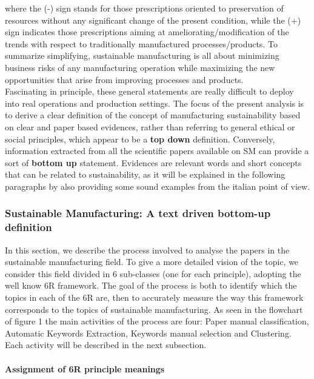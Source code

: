 \documentclass[]{book}
\let\oldparagraph\paragraph
\renewcommand{\paragraph}[1]{\oldparagraph{#1}\mbox{}}
\begin{document}
where the (-) sign stands for those prescriptions oriented to
preservation of resources without any significant change of the present
condition, while the (+) sign indicates those prescriptions aiming at
ameliorating/modification of the trends with respect to traditionally
manufactured processes/products. To summarize simplifying, sustainable
manufacturing is all about minimizing business risks of any
manufacturing operation while maximizing the new opportunities that
arise from improving processes and products.\\
Fascinating in principle, these general statements are really difficult
to deploy into real operations and production settings. The focus of the
present analysis is to derive a clear definition of the concept of
manufacturing sustainability based on clear and paper based evidences,
rather than referring to general ethical or social principles, which
appear to be a \textbf{top down} definition. Conversely, information
extracted from all the scientific papers available on SM can provide a
sort of \textbf{bottom up} statement. Evidences are relevant words and
short concepts that can be related to sustainability, as it will be
explained in the following paragraphs by also providing some sound
examples from the italian point of view.

\subsubsection{Sustainable Manufacturing: A text driven bottom-up
definition}\label{smtextdrivenbottomup}

In this section, we describe the process involved to analyse the papers
in the sustainable manufacturing field. To give a more detailed vision
of the topic, we consider this field divided in 6 sub-classes (one for
each principle), adopting the well know 6R framework. The goal of the
process is both to identify which the topics in each of the 6R are, then
to accurately measure the way this framework corresponds to the topics
of sustainable manufacturing. As seen in the flowchart of figure 1 the
main activities of the process are four: Paper manual classification,
Automatic Keywords Extraction, Keywords manual selection and Clustering.
Each activity will be described in the next subsection.

\paragraph{Assignment of 6R principle
meanings}\label{assignment-of-6r-principle-meanings}
\end{document}
